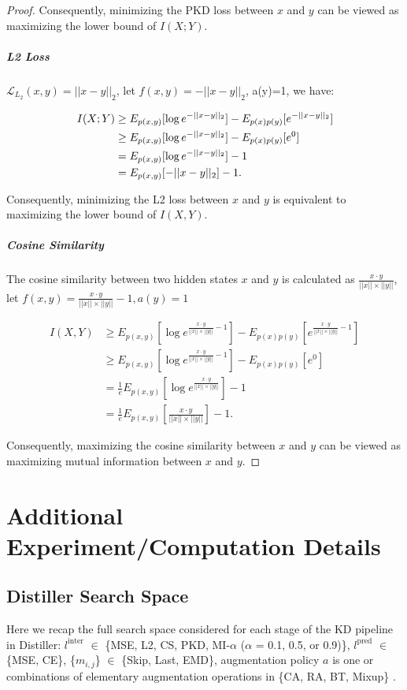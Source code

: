 \documentclass[11pt]{article}
\begin{document}
\begin{proof}
Consequently, minimizing the PKD loss between $x$ and $y$ can be viewed as maximizing the lower bound of $I(X;Y)$.

\subparagraph{L2 Loss}

$\mathcal{L}_{L_2}(x,y) = ||x-y||_2$, let $f(x,y)=-||x-y||_2$, a(y)=1, we have:
\begin{small}
\begin{equation}
\begin{split}
I (X;Y)&\geq  E_{p(x,y)}[\log e^{-||x-y||_2}] - E_{p(x)p(y)}[e^{-||x-y||_2}] \notag \\
&\geq  E_{p(x,y)}[\log e^{-||x-y||_2}] - E_{p(x)p(y)}[e^0] \notag \\
&= E_{p(x,y)}[\log e^{-||x-y||_2}] - 1\\&= E_{p(x,y)}[-||x-y||_2] - 1 .
\end{split}
\end{equation}
\end{small}

Consequently, minimizing the L2 loss between $x$ and $y$ is equivalent to maximizing the lower bound of $I(X,Y)$.
\subparagraph{Cosine Similarity}
The cosine similarity between two hidden states $x$ and $y$ is calculated as $\frac{x \cdot y}{||x||\times||y||}$, let $f(x,y)=\frac{x \cdot y}{||x||\times||y||}-1, a(y)=1$
\begin{small}
\begin{equation*}
\begin{split}
I(X,Y)&\geq E_{p(x,y)}[\log e^{\frac{x \cdot y}{||x||\times||y||}-1}]-E_{p(x)p(y)}[e^{\frac{x \cdot y}{||x||\times||y||}-1}]\\
&\geq E_{p(x,y)}[\log e^{\frac{x \cdot y}{||x||\times||y||}-1}]-E_{p(x)p(y)}[e^0] \\
&= \frac{1}{e}E_{p(x,y)}[\log e^{\frac{x \cdot y}{||x||\times||y||}}]-1 \\ &= \frac{1}{e}E_{p(x,y)}[\frac{x \cdot y}{||x||\times||y||}]-1 .
\end{split}
\end{equation*}
\end{small}
Consequently, maximizing the cosine similarity between $x$ and $y$ can be viewed as maximizing mutual information between $x$ and $y$.
\end{proof}

\section{Additional Experiment/Computation Details}
\subsection{Distiller Search Space}
\label{sec:app:searchspace}
Here we recap the full search space considered for each stage of the KD pipeline in Distiller:
$l^{\text{inter}}$ $\in$ \{MSE, L2, CS, PKD, MI-$\alpha$ ($\alpha$ = 0.1, 0.5, or 0.9)\}, $l^{\text{pred}}$ $\in$ \{MSE, CE\}, \{$m_{i,j}$\} $\in$ \{Skip, Last, EMD\}, augmentation policy $a$ is one or combinations of elementary augmentation operations in \{CA, RA, BT, Mixup\} .
\end{document}
